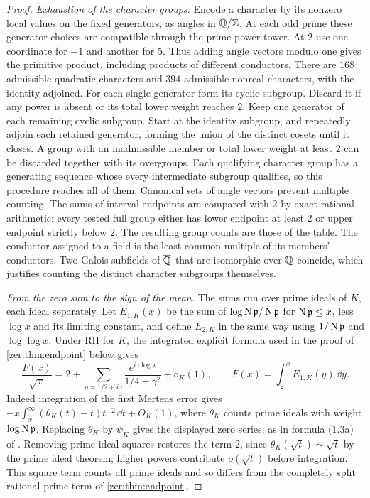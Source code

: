 \begin{proof}
\emph{Exhaustion of the character groups.} Encode a character by its nonzero local values
on the fixed generators, as angles in $\mathbb{Q}/\mathbb{Z}$. At each odd prime these generator choices
are compatible through the prime-power tower. At $2$ use one coordinate for $-1$ and
another for $5$. Thus adding angle vectors modulo one gives the primitive product,
including products of different conductors. There are $168$ admissible quadratic
characters and $394$ admissible nonreal characters, with the identity adjoined. For each
single generator form its cyclic subgroup. Discard it if any power is absent or its total
lower weight reaches $2$. Keep one generator of each remaining cyclic subgroup. Start at
the identity subgroup, and repeatedly adjoin each retained generator, forming the union of
the distinct cosets until it closes. A group with an inadmissible member or total lower
weight at least $2$ can be discarded together with its overgroups. Each qualifying
character group has a generating sequence whose every intermediate subgroup qualifies, so
this procedure reaches all of them. Canonical sets of angle vectors prevent multiple
counting. The sums of interval endpoints are compared with $2$ by exact rational
arithmetic: every tested full group either has lower endpoint at least $2$ or upper
endpoint strictly below $2$. The resulting group counts are those of the table. The
conductor assigned to a field is the least common multiple of its members' conductors.
Two Galois subfields of $\overline{\mathbb{Q}}$ that are isomorphic over $\mathbb{Q}$ coincide, which
justifies counting the distinct character subgroups themselves.

\emph{From the zero sum to the sign of the mean.} The sums run over prime ideals of $K$,
each ideal separately. Let $E_{1,K}(x)$ be the sum of $\log\operatorname{N}\mathfrak p/\operatorname{N}\mathfrak p$
for $\operatorname{N}\mathfrak p\le x$, less $\log x$ and its limiting constant, and define $E_{2,K}$
in the same way using $1/\operatorname{N}\mathfrak p$ and $\log\log x$. Under RH for $K$, the integrated
explicit formula used in the proof of \cref{zer:thm:endpoint} below gives
\[
 \frac{F(x)}{\sqrt x}=2+\sum_{\rho=1/2+i\gamma}\frac{e^{i\gamma\log x}}{1/4+\gamma^2}+o_K(1),
 \qquad F(x)=\int_2^xE_{1,K}(y)\,\dd y .
\]
Indeed integration of the first Mertens error gives
$-x\int_x^\infty(\theta_K(t)-t)t^{-2}\,\dd t+O_K(1)$, where $\theta_K$ counts prime ideals
with weight $\log\operatorname{N}\mathfrak p$. Replacing $\theta_K$ by $\psi_K$ gives the displayed zero
series, as in formula (1.3a) of \cite{GrenieMolteni2016Smoothed}. Removing prime-ideal
squares restores the term $2$, since $\theta_K(\sqrt t)\sim\sqrt t$ by the prime ideal
theorem; higher powers contribute $o(\sqrt t)$ before integration. This square term counts
all prime ideals and so differs from the completely split rational-prime term of
\cref{zer:thm:endpoint}.


\end{proof}
